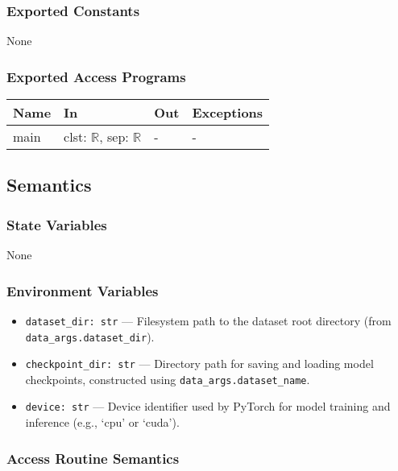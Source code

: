 \documentclass[12pt, titlepage]{article}
\begin{document}
\subsubsection{Exported Constants}
None

\subsubsection{Exported Access Programs}
\begin{center}
\begin{tabular}{p{3cm} >{\raggedright\arraybackslash}p{6cm} p{4.5cm} p{3cm}}
\hline
\textbf{Name} & \textbf{In} & \textbf{Out} & \textbf{Exceptions} \\
\hline
main & clst: \(\mathbb{R}\), sep: \(\mathbb{R}\) & - & - \\
\hline
\end{tabular}
\end{center}

\subsection{Semantics}

\subsubsection{State Variables}
None

\subsubsection{Environment Variables}
\begin{itemize}
  \item \texttt{dataset\_dir: str} — Filesystem path to the dataset root directory (from \texttt{data\_args.dataset\_dir}).
  \item \texttt{checkpoint\_dir: str} — Directory path for saving and loading model checkpoints, constructed using \texttt{data\_args.dataset\_name}.
  \item \texttt{device: str} — Device identifier used by PyTorch for model training and inference (e.g., `cpu' or `cuda').
\end{itemize}

\subsubsection{Access Routine Semantics}
\end{document}
